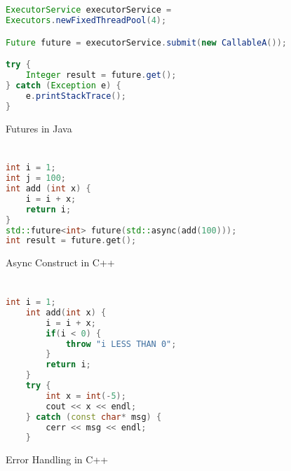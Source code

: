 \documentclass[]{report}
\begin{document}
\chapter{}
\begin{figure}[h!]
	\caption{Futures in Java}
	\begin{lstlisting}[language=Java,frame=single]
ExecutorService executorService =
Executors.newFixedThreadPool(4);

Future future = executorService.submit(new CallableA());

try {
	Integer result = future.get();
} catch (Exception e) {
	e.printStackTrace();
}	
	\end{lstlisting}
\end{figure}

\chapter{}
\begin{figure}[h!]
	\caption{Async Construct in C++}
	\begin{lstlisting}[language=C++,frame=single]
int i = 1;
int j = 100;
int add (int x) {
	i = i + x;
	return i;
}
std::future<int> future(std::async(add(100)));
int result = future.get();
	\end{lstlisting}
\end{figure}

\chapter{}
\begin{figure}[h!]
	\caption{Error Handling in C++}
	\begin{lstlisting}[language=C++,frame=single]
	int i = 1;
	int add(int x) {
		i = i + x;
		if(i < 0) {
			throw "i LESS THAN 0";
		}
		return i;
	}
	try {
		int x = int(-5);
		cout << x << endl;
	} catch (const char* msg) {
		cerr << msg << endl;
	}
	\end{lstlisting}
\end{figure}
\end{document}
